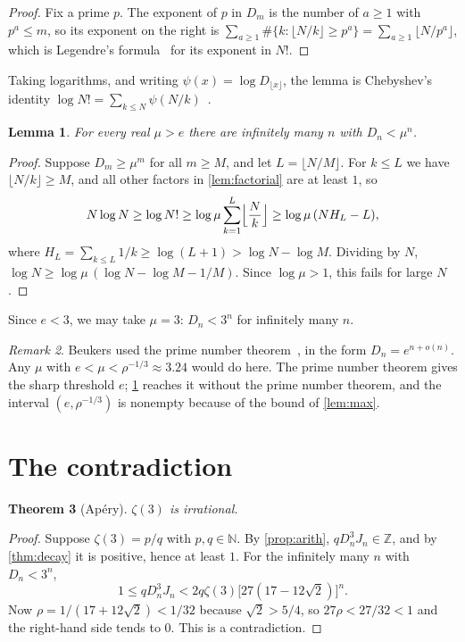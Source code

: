 \documentclass[11pt]{article}
\newcommand{\Z}{\mathbb{Z}}
\newcommand{\N}{\mathbb{N}}
\newcommand{\Dn}{D_n}
\theoremstyle{plain}
\newtheorem{theorem}{Theorem}[section]
\newtheorem{lemma}[theorem]{Lemma}
\theoremstyle{definition}
\theoremstyle{remark}
\newtheorem{remark}[theorem]{Remark}
\begin{document}
\begin{proof}
Fix a prime $p$. The exponent of $p$ in $D_m$ is the number of $a\ge1$ with $p^a\le m$, so its
exponent on the right is $\sum_{a\ge1}\#\{k:\lfloor N/k\rfloor\ge p^a\}=\sum_{a\ge1}\lfloor N/p^a\rfloor$,
which is Legendre's formula~\cite{legendre} for its exponent in $N!$.
\end{proof}

Taking logarithms, and writing $\psi(x)=\log D_{\lfloor x\rfloor}$, the lemma is Chebyshev's identity
$\log N!=\sum_{k\le N}\psi(N/k)$~\cite{chebyshev}.

\begin{lemma}\label{lem:lcm}
For every real $\mu>e$ there are infinitely many $n$ with $\Dn<\mu^n$.
\end{lemma}

\begin{proof}
Suppose $D_m\ge\mu^m$ for all $m\ge M$, and let $L=\lfloor N/M\rfloor$. For $k\le L$ we have
$\lfloor N/k\rfloor\ge M$, and all other factors in \cref{lem:factorial} are at least $1$, so
\[
  N\log N\ge\log N!\ge\log\mu\sum_{k=1}^L\Bigl\lfloor\frac Nk\Bigr\rfloor\ge\log\mu\,(NH_L-L),
\]
where $H_L=\sum_{k\le L}1/k\ge\log(L+1)>\log N-\log M$. Dividing by $N$,
$\log N\ge\log\mu\,(\log N-\log M-1/M)$. Since $\log\mu>1$, this fails for large $N$.
\end{proof}

Since $e<3$, we may take $\mu=3$: $\Dn<3^n$ for infinitely many $n$.

\begin{remark}
Beukers used the prime number theorem~\cite{hadamard,dlvp}, in the form $\Dn=e^{n+o(n)}$. Any $\mu$ with $e<\mu<\rho^{-1/3}\approx3.24$
would do here. The prime number theorem gives the sharp threshold $e$; \cref{lem:lcm} reaches it
without the prime number theorem, and the interval $(e,\rho^{-1/3})$ is nonempty because of the
bound of \cref{lem:max}.
\end{remark}

\section{The contradiction}\label{sec:contradiction}

\begin{theorem}[Ap\'ery]\label{thm:apery}
$\zeta(3)$ is irrational.
\end{theorem}

\begin{proof}
Suppose $\zeta(3)=p/q$ with $p,q\in\N$. By \cref{prop:arith}, $q\Dn^3J_n\in\Z$, and by
\cref{thm:decay} it is positive, hence at least $1$. For the infinitely many $n$ with $\Dn<3^n$,
\[
  1\le q\Dn^3J_n<2q\zeta(3)\bigl[27(17-12\sqrt2)\bigr]^n .
\]
Now $\rho=1/(17+12\sqrt2)<1/32$ because $\sqrt2>5/4$, so $27\rho<27/32<1$ and the right-hand side
tends to $0$. This is a contradiction.
\end{proof}
\end{document}
